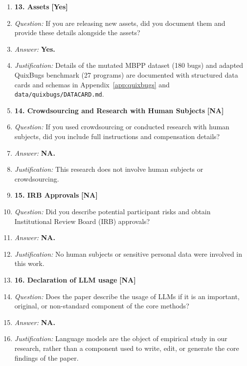 \documentclass{article}
\begin{document}
\begin{enumerate}
\item[] \textbf{13. Assets} \hfill \textbf{[Yes]}
\item[] \textit{Question:} If you are releasing new assets, did you document them and provide these details alongside the assets?
\item[] \textit{Answer:} \textbf{Yes.}
\item[] \textit{Justification:} Details of the mutated MBPP dataset (180 bugs) and adapted QuixBugs benchmark (27 programs) are documented with structured data cards and schemas in Appendix~\ref{app:quixbugs} and \texttt{data/quixbugs/DATACARD.md}.

\item[] \textbf{14. Crowdsourcing and Research with Human Subjects} \hfill \textbf{[NA]}
\item[] \textit{Question:} If you used crowdsourcing or conducted research with human subjects, did you include full instructions and compensation details?
\item[] \textit{Answer:} \textbf{NA.}
\item[] \textit{Justification:} This research does not involve human subjects or crowdsourcing.

\item[] \textbf{15. IRB Approvals} \hfill \textbf{[NA]}
\item[] \textit{Question:} Did you describe potential participant risks and obtain Institutional Review Board (IRB) approvals?
\item[] \textit{Answer:} \textbf{NA.}
\item[] \textit{Justification:} No human subjects or sensitive personal data were involved in this work.

\item[] \textbf{16. Declaration of LLM usage} \hfill \textbf{[NA]}
\item[] \textit{Question:} Does the paper describe the usage of LLMs if it is an important, original, or non-standard component of the core methods?
\item[] \textit{Answer:} \textbf{NA.}
\item[] \textit{Justification:} Language models are the object of empirical study in our research, rather than a component used to write, edit, or generate the core findings of the paper.

\end{enumerate}
\end{document}
